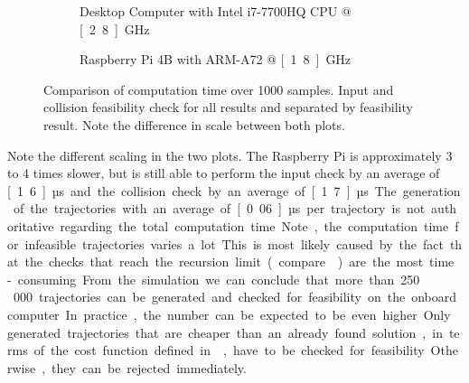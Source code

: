 \begin{figure}
\begin{subfigure}[b]{0.49\textwidth}
		\caption{Desktop Computer with Intel i7-7700HQ CPU @ \unit[2.8]{GHz}}
		\label{fig:computation-time-desktop}
	\end{subfigure}
	\begin{subfigure}[b]{0.49\textwidth}
	\caption{Raspberry Pi 4B with ARM-A72 @ \unit[1.8]{GHz}}
	\label{fig:computation-time-pi}
	\end{subfigure}
	\caption{Comparison of computation time over 1000 samples. Input and collision feasibility check for all results and separated by feasibility result. Note the difference in scale between both plots.}
    \label{fig:computation-time}
\end{figure}
Note the different scaling in the two plots.
The Raspberry Pi is approximately 3 to 4 times slower, but is still able to perform the input check by an average of \unit[1.6]{µs} and the collision check by an average of \unit[1.7]{µs}.
The generation of the trajectories with an average of \unit[0.06]{µs} per trajectory is not authoritative regarding the total computation time.
Note, the computation time for infeasible trajectories varies a lot.
This is most likely caused by the fact that the checks that reach the recursion limit (compare ) are the most time-consuming.
From the simulation we can conclude that more than 250\,000 trajectories can be generated and checked for feasibility on the onboard computer. 
In practice, the number can be expected to be even higher.
Only generated trajectories that are cheaper than an already found solution, in terms of the cost function defined in , have to be checked for feasibility. Otherwise, they can be rejected immediately.


